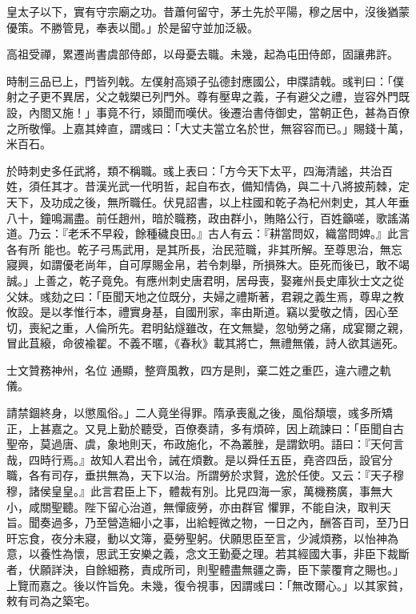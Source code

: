 \begin{pinyinscope}
 皇太子以下，實有守宗廟之功。昔蕭何留守，茅土先於平陽，穆之居中，沒後猶蒙優策。不勝管見，奉表以聞。」於是留守並加泛級。



 高祖受禪，累遷尚書虞部侍郎，以母憂去職。未幾，起為屯田侍郎，固讓弗許。



 時制三品已上，門皆列戟。左僕射高熲子弘德封應國公，申牒請戟。彧判曰：「僕射之子更不異居，父之戟槊已列門外。尊有壓卑之義，子有避父之禮，豈容外門既
 設，內閤又施！」事竟不行，熲聞而嘆伏。後遷治書侍御史，當朝正色，甚為百僚之所敬憚。上嘉其婞直，謂彧曰：「大丈夫當立名於世，無容容而已。」賜錢十萬，米百石。



 於時刺史多任武將，類不稱職。彧上表曰：「方今天下太平，四海清謐，共治百姓，須任其才。昔漢光武一代明哲，起自布衣，備知情偽，與二十八將披荊棘，定天下，及功成之後，無所職任。伏見詔書，以上柱國和乾子為杞州刺史，其人年垂八十，鐘鳴漏盡。前任趙州，暗於職務，政由群小，賄賂公行，百姓籲嗟，歌謠滿道。乃云：『老禾不早殺，餘種穢良田。』古人有云：『耕當問奴，織當問婢。』此言各有所
 能也。乾子弓馬武用，是其所長，治民蒞職，非其所解。至尊思治，無忘寢興，如謂優老尚年，自可厚賜金帛，若令刺舉，所損殊大。臣死而後已，敢不竭誠。」上善之，乾子竟免。有應州刺史唐君明，居母喪，娶雍州長史庫狄士文之從父妹。彧劾之曰：「臣聞天地之位既分，夫婦之禮斯著，君親之義生焉，尊卑之教攸設。是以孝惟行本，禮實身基，自國刑家，率由斯道。竊以愛敬之情，因心至切，喪紀之重，人倫所先。君明鉆燧雖改，在文無變，忽劬勞之痛，成宴爾之親，冒此苴縗，命彼褕翟。不義不暱，《春秋》載其將亡，無禮無儀，詩人欲其遄死。



 士文贊務神州，名位
 通顯，整齊風教，四方是則，棄二姓之重匹，違六禮之軌儀。



 請禁錮終身，以懲風俗。」二人竟坐得罪。隋承喪亂之後，風俗頹壞，彧多所矯正，上甚嘉之。又見上勤於聽受，百僚奏請，多有煩碎，因上疏諫曰：「臣聞自古聖帝，莫過唐、虞，象地則天，布政施化，不為叢脞，是謂欽明。語曰：『天何言哉，四時行焉。』故知人君出令，誡在煩數。是以舜任五臣，堯咨四岳，設官分職，各有司存，垂拱無為，天下以治。所謂勞於求賢，逸於任使。又云：『天子穆穆，諸侯皇皇。』此言君臣上下，體裁有別。比見四海一家，萬機務廣，事無大小，咸關聖聽。陛下留心治道，無憚疲勞，亦由群官
 懼罪，不能自決，取判天旨。聞奏過多，乃至營造細小之事，出給輕微之物，一日之內，酬答百司，至乃日旰忘食，夜分未寢，動以文簿，憂勞聖躬。伏願思臣至言，少減煩務，以怡神為意，以養性為懷，思武王安樂之義，念文王勤憂之理。若其經國大事，非臣下裁斷者，伏願詳決，自餘細務，責成所司，則聖體盡無疆之壽，臣下蒙覆育之賜也。」上覽而嘉之。後以忤旨免。未幾，復令視事，因謂彧曰：「無改爾心。」以其家貧，敕有司為之築宅。




\end{pinyinscope}
